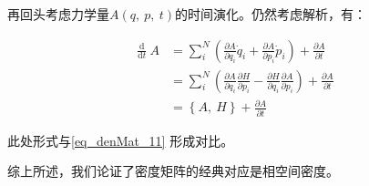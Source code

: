 再回头考虑力学量$ A \left(q,~p,~t\right)$的时间演化。仍然考虑解析，有：

\begin{equation}
\begin{aligned}
\frac{\mathrm{d}}{\mathrm{d} t}\ A  
&=  \sum_i^N\left(
    \frac{\partial A}{\partial q_i}\dot{q}_i +
    \frac{\partial A}{\partial p_i}\dot{p}_i 
    \right)+
    \frac{\partial A}{\partial t} \\
&=  \sum_i^N\left(
    \frac{\partial A}{\partial q_i}\frac{\partial H}{\partial p_i} -
    \frac{\partial H}{\partial q_i}\frac{\partial A}{\partial p_i} 
    \right)+
    \frac{\partial A}{\partial t} \\
&=  \left\{ A,~H \right\} + \frac{\partial A}{\partial t}    
\end{aligned}~
\end{equation}

此处形式与\autoref{eq_denMat_11} 形成对比。

综上所述，我们论证了密度矩阵的经典对应是相空间密度。
